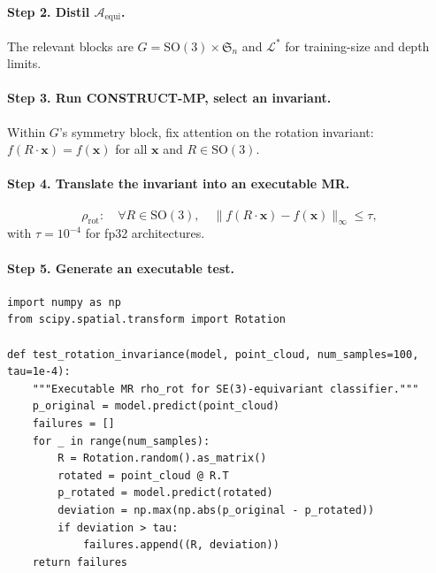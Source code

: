\documentclass[acmsmall, screen]{acmart}
\begin{document}
\paragraph{Step 2. Distil $\mathcal{A}_{\mathrm{equi}}$.} The relevant blocks are $G = \mathrm{SO}(3)\times\mathfrak{S}_n$ and $\mathcal{L}^{*}$ for training-size and depth limits.

\paragraph{Step 3. Run CONSTRUCT-MP, select an invariant.} Within $G$'s symmetry block, fix attention on the rotation invariant: $f(R \cdot \mathbf{x}) = f(\mathbf{x})$ for all $\mathbf{x}$ and $R \in \mathrm{SO}(3)$.

\paragraph{Step 4. Translate the invariant into an executable MR.}
\begin{equation}
\label{eq:rho-rot}
\rho_{\mathrm{rot}}: \quad \forall R \in \mathrm{SO}(3), \quad \big\| f(R \cdot \mathbf{x}) - f(\mathbf{x}) \big\|_\infty \le \tau,
\end{equation}
with $\tau = 10^{-4}$ for fp32 architectures.

\paragraph{Step 5. Generate an executable test.}
\begin{lstlisting}[style=pythonstyle, caption={Executable MR $\rho_{\mathrm{rot}}$ for SE(3)-equivariant classifier.}]
import numpy as np
from scipy.spatial.transform import Rotation

def test_rotation_invariance(model, point_cloud, num_samples=100, tau=1e-4):
    """Executable MR rho_rot for SE(3)-equivariant classifier."""
    p_original = model.predict(point_cloud)
    failures = []
    for _ in range(num_samples):
        R = Rotation.random().as_matrix()
        rotated = point_cloud @ R.T
        p_rotated = model.predict(rotated)
        deviation = np.max(np.abs(p_original - p_rotated))
        if deviation > tau:
            failures.append((R, deviation))
    return failures
\end{lstlisting}
\end{document}
